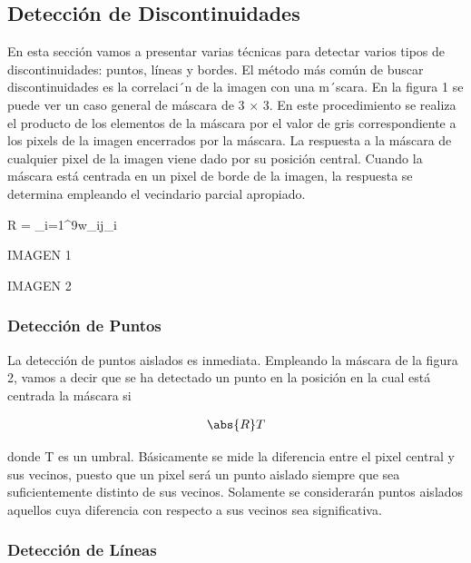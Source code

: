 \documentclass[14pt]{article}
\begin{document}
\subsection{Detección de Discontinuidades}

En esta sección vamos a presentar varias técnicas para detectar varios tipos de discontinuidades: puntos, líneas y bordes. El método más común de buscar discontinuidades es la correlaci´n de la imagen con una m´scara. En la ﬁgura 1 se puede ver un caso general de máscara de 3 × 3. En este procedimiento se realiza el producto de los elementos de la máscara por el valor de gris correspondiente a los pixels de la imagen encerrados por la máscara. La respuesta a la máscara de cualquier pixel de la imagen viene dado por su posición central. Cuando la máscara está centrada en un pixel de borde de la imagen, la respuesta se determina empleando el vecindario parcial apropiado.

\begin{center}
R = \sum_{i=1}^9{w_ij_i}
\end{center}

IMAGEN 1

IMAGEN 2

\subsubsection{Detección de Puntos}

La detección de puntos aislados es inmediata. Empleando la máscara de la ﬁgura 2, vamos a decir que se ha detectado un punto en la posición en la cual está centrada la máscara si

\begin{center}

\begin{gather}
\abs{R}  T
\end{gather}

\end{center}

donde T es un umbral. Básicamente se mide la diferencia entre el pixel central y sus vecinos, puesto que un pixel será un punto aislado siempre que sea suﬁcientemente distinto de sus vecinos. Solamente se considerarán puntos aislados aquellos cuya diferencia con respecto a sus vecinos sea signiﬁcativa.

\subsubsection{Detección de Líneas}
\end{document}
